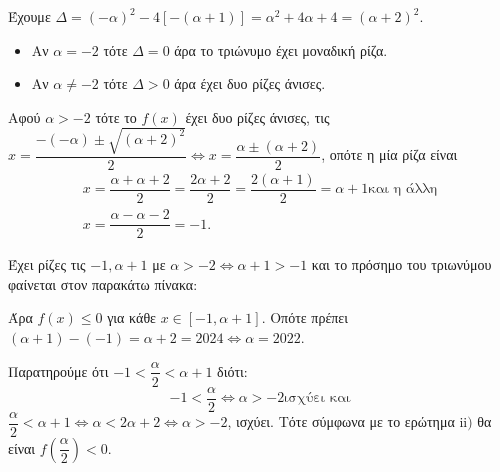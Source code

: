 
\begin{alist}
\item Έχουμε $\Delta = (-\alpha)^2 - 4[-(\alpha + 1)] = \alpha^2 + 4\alpha + 4 = (\alpha + 2)^2$.
\begin{itemize}
\item Αν $\alpha = -2$ τότε $\Delta = 0$ άρα το τριώνυμο έχει μοναδική ρίζα.
\item Αν $\alpha \ne -2$ τότε $\Delta > 0$ άρα έχει δυο ρίζες άνισες.
\end{itemize}

\item 
\begin{rlist}
\item Αφού $\alpha > -2$ τότε το $f(x)$ έχει δυο ρίζες άνισες, τις $x = \dfrac{-(-\alpha) \pm \sqrt{(\alpha+2)^2}}{2} \Leftrightarrow x = \dfrac{\alpha \pm (\alpha+2)}{2}$, οπότε η μία ρίζα είναι 
\begin{gather*}
x = \dfrac{\alpha + \alpha + 2}{2} = \dfrac{2\alpha+2}{2} = \dfrac{2(\alpha+1)}{2} = \alpha + 1\text{και η άλλη} \\
x = \dfrac{\alpha - \alpha - 2}{2} = -1.
\end{gather*}
\item Έχει ρίζες τις $-1, \alpha + 1$ με $\alpha > -2 \Leftrightarrow \alpha + 1 > -1$ και το πρόσημο του τριωνύμου
φαίνεται στον παρακάτω πίνακα:
\begin{center}
\end{center}
Άρα $f(x) \le 0$ για κάθε $x \in [-1, \alpha + 1]$.
Οπότε πρέπει $(\alpha + 1) - (-1) = \alpha + 2 = 2024 \Leftrightarrow \alpha = 2022$.
\item Παρατηρούμε ότι $-1 < \dfrac{\alpha}{2} < \alpha + 1$ διότι:
\[-1 < \dfrac{\alpha}{2} \Leftrightarrow \alpha > -2\text{ισχύει και}\]
$\dfrac{\alpha}{2} < \alpha + 1 \Leftrightarrow \alpha < 2\alpha + 2 \Leftrightarrow \alpha > -2$, ισχύει.
Τότε σύμφωνα με το ερώτημα $\text{ii)}$ θα είναι $f\left(\dfrac{\alpha}{2}\right) < 0$.
\end{rlist}
\end{alist}

